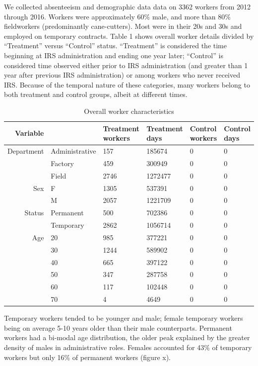 \documentclass[]{article}
\begin{document}
We collected absenteeism and demographic data data on 3362 workers from
2012 through 2016. Workers were approximately 60\% male, and more than
80\% fieldworkers (predominantly cane-cutters). Most were in their 20s
and 30s and employed on temporary contracts. Table 1 shows overall
worker details divided by ``Treatment'' versus ``Control'' status.
``Treatment'' is considered the time beginning at IRS administration and
ending one year later; ``Control'' is considered time observed either
prior to IRS administration (and greater than 1 year after previous IRS
administration) or among workers who never received IRS. Because of the
temporal nature of these categories, many workers belong to both
treatment and control groups, albeit at different times.

\begin{table}[ht]
\centering
\begin{tabular}{rlllll}
  \hline
Variable &   & Treatment workers & Treatment days & Control workers & Control days \\ 
  \hline
Department & Administrative & 157 & 185674 &   0 &   0 \\ 
   & Factory & 459 & 300949 &   0 &   0 \\ 
   & Field & 2746 & 1272477 &   0 &   0 \\ 
  Sex & F & 1305 & 537391 &   0 &   0 \\ 
   & M & 2057 & 1221709 &   0 &   0 \\ 
  Status & Permanent & 500 & 702386 &   0 &   0 \\ 
   & Temporary & 2862 & 1056714 &   0 &   0 \\ 
  Age & 20 & 985 & 377221 &   0 &   0 \\ 
   & 30 & 1244 & 589902 &   0 &   0 \\ 
   & 40 & 665 & 397122 &   0 &   0 \\ 
   & 50 & 347 & 287758 &   0 &   0 \\ 
   & 60 & 117 & 102448 &   0 &   0 \\ 
   & 70 &   4 & 4649 &   0 &   0 \\ 
   \hline
\end{tabular}
\caption{Overall worker characteristics} 
\end{table}

Temporary workers tended to be younger and male; female temporary
workers being on average 5-10 years older than their male counterparts.
Permanent workers had a bi-modal age distribution, the older peak
explained by the greater density of males in administrative roles.
Females accounted for 43\% of temporary workers but only 16\% of
permanent workers (figure x).
\end{document}
